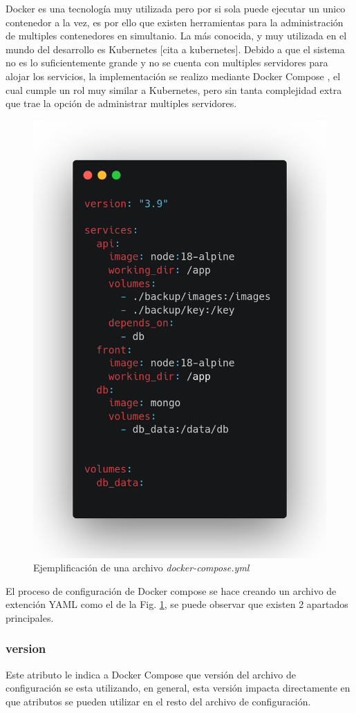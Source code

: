 Docker es una tecnología muy utilizada pero por si sola puede ejecutar un unico contenedor a la vez, es por ello que existen herramientas para la administración de multiples contenedores en simultanio. La más conocida, y muy utilizada en el mundo del desarrollo es Kubernetes [cita a kubernetes]. Debido a que el sistema no es lo suficientemente grande y no se cuenta con multiples servidores para alojar los servicios, la implementación se realizo mediante Docker Compose \cite{docker_inc_docker_2023}, el cual cumple un rol muy similar a Kubernetes, pero sin tanta complejidad extra que trae la opción de administrar multiples servidores.
\begin{figure}
    \centering
    \includegraphics[width=.5\textwidth]{imgs/docker-compose.png}
    \caption{Ejemplificación de una archivo \textit{docker-compose.yml}}
    \label{fig:docker-compose-yml}
\end{figure}

El proceso de configuración de Docker compose se hace creando un archivo de extención YAML como el de la Fig. \ref{fig:docker-compose-yml}, se puede observar que existen 2 apartados principales.

\subsubsection*{version}

Este atributo le indica a Docker Compose que versión del archivo de configuración se esta utilizando, en general, esta versión impacta directamente en que atributos se pueden utilizar en el resto del archivo de configuración.

